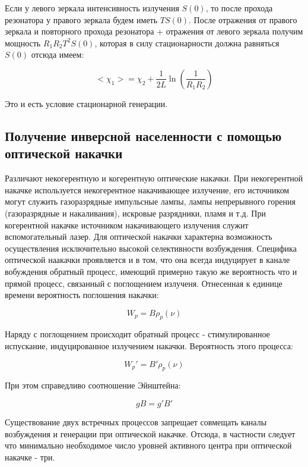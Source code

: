 \documentclass[a4paper]{article}
\begin{document}
Если у левого зеркала интенсивность излучения $S(0)$, то после прохода резонатора у правого зеркала  будем иметь $TS(0)$. После отражения от правого зеркала и повторного прохода резонатора + отражения от левого зеркала получим мощность $R_1 R_2 T^2 S(0)$, которая в силу стационарности должна равняться $S(0)$ отсюда имеем:

\begin{equation}
	< \chi_1 > = \chi_2 + \frac{1}{2L}\ln(\frac{1}{R_1R_2})
\end{equation}

Это и есть условие стационарной генерации.

\subsection{Получение инверсной населенности с помощью оптической накачки}

Различают некогерентную и когерентную оптические накачки. При некогерентной накачке используется некогерентное накачивающее излучение, его источником могут служить газоразрядные импульсные лампы, лампы непрерывного горения (газоразрядные и накаливания), искровые разрядники, пламя и т.д. При когерентной накачке источником накачивающего излучения служит вспомогательный лазер. Для оптической накачки характерна возможность осуществления исключительно высокой селективности возбуждения.
Специфика оптической наакачки проявляется и в том, что она всегда индуцирует в канале вобуждения обратный процесс, имеющий примерно такую же вероятность что и прямой процесс, связанный с поглощением излученя. Отнесенная к единице времени вероятность поглошения накачки:

\begin{equation}
	W_p  = B \rho_p(\nu) 
\end{equation}

Наряду с поглощением происходит обратный процесс - стимулированное испускание, индуцированное излучением накачки. Вероятность этого процесса:

\begin{equation}
	W_p' = B' \rho_p(\nu)
\end{equation}

При этом справедливо соотношение Эйнштейна:

\begin{equation}
	gB = g'B'
\end{equation}

Существование двух встречных процессов запрещает совмещать каналы возбуждения и генерации при оптической накачке. Отсюда, в частности следует что минимально необходимое число уровней активного центра при оптической накачке - три.
\end{document}
